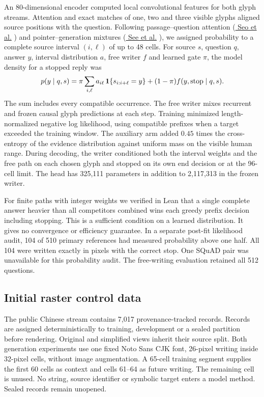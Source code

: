 \documentclass[12pt,a4paper]{article}
\providecommand{\DIFadd}[1]{{\protect\color{blue} \sf #1}} %
\providecommand{\DIFaddend}{} %
\begin{document}
\DIFadd{An 80-dimensional encoder computed local convolutional features for both glyph streams. Attention and exact matches of one, two and three visible glyphs aligned source positions with the question. Following passage--question attention (}\href{https://arxiv.org/abs/1611.01603}{\DIFadd{Seo et al.}}\DIFadd{) and pointer--generation mixtures (}\href{https://aclanthology.org/P17-1099/}{\DIFadd{See et al.}}\DIFadd{), we assigned probability to a complete source interval $(i,\ell)$ of up to 48 cells. For source $s$, question $q$, answer $y$, interval distribution $a$, free writer $f$ and learned gate $\pi$, the model density for a stopped reply was
}\[
 p(y\mid q,s)=\pi\sum_{i,\ell}a_{i\ell}\,
 {\bf1}\{s_{i:i+\ell}=y\}+(1-\pi)f(y,\mathrm{stop}\mid q,s).
\]
\DIFadd{The sum includes every compatible occurrence. The free writer mixes recurrent and frozen causal glyph predictions at each step. Training minimized length-normalized negative log likelihood, using compatible prefixes when a target exceeded the training window. The auxiliary arm added $0.45$ times the cross-entropy of the evidence distribution against uniform mass on the visible human range. During decoding, the writer conditioned both the interval weights and the free path on each chosen glyph and stopped on its own end decision or at the 96-cell limit. The head has 325,111 parameters in addition to 2,117,313 in the frozen writer.
}

\DIFadd{For finite paths with integer weights we verified in Lean that a single complete answer heavier than all competitors combined wins each greedy prefix decision including stopping. This is a sufficient condition on a learned distribution. It gives no convergence or efficiency guarantee. In a separate post-fit likelihood audit, 104 of 510 primary references had measured probability above one half. All 104 were written exactly in pixels with the correct stop. One SQuAD pair was unavailable for this probability audit. The free-writing evaluation retained all 512 questions.
}


\DIFaddend \subsection*{Initial raster control data}
The public Chinese stream contains 7,017 provenance-tracked records. Records
are assigned deterministically to training, development or a sealed partition
before rendering. Original and simplified views inherit their source split.
Both generation experiments use one fixed Noto Sans CJK font, 26-pixel writing
inside 32-pixel cells, without image augmentation. A 65-cell training segment
supplies the first 60 cells as context and cells 61--64 as future writing.
The remaining cell is unused. No string, source identifier or symbolic target
enters a model method. Sealed records remain unopened.
\end{document}
